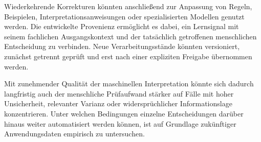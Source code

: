 Wiederkehrende Korrekturen könnten anschließend zur Anpassung von Regeln,
Beispielen, Interpretationsanweisungen oder spezialisierten Modellen genutzt
werden. Die entwickelte Provenienz ermöglicht es dabei, ein Lernsignal mit
seinem fachlichen Ausgangskontext und der tatsächlich getroffenen
menschlichen Entscheidung zu verbinden. Neue Verarbeitungsstände könnten
versioniert, zunächst getrennt geprüft und erst nach einer expliziten
Freigabe übernommen werden.

Mit zunehmender Qualität der maschinellen Interpretation könnte sich dadurch
langfristig auch der menschliche Prüfaufwand stärker auf Fälle mit hoher
Unsicherheit, relevanter Varianz oder widersprüchlicher Informationslage
konzentrieren. Unter welchen Bedingungen einzelne Entscheidungen darüber
hinaus weiter automatisiert werden können, ist auf Grundlage zukünftiger
Anwendungsdaten empirisch zu untersuchen.